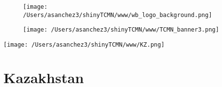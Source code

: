 \documentclass{article}\usepackage[]{graphicx}\usepackage[]{color}
\begin{document}
%

\begin{figure}
  \vspace{-3ex} %
  \hspace{-7ex} %
  \texttt{[image: /Users/asanchez3/shinyTCMN/www/wb\_logo\_background.png]}
\end{figure}
\begin{figure}
  \begin{minipage}[t]{0.99\textwidth} %
      \vspace{-30ex}
      \hspace{-2ex}
      \raggedright{\texttt{[image: /Users/asanchez3/shinyTCMN/www/TCMN\_banner3.png]}}
  \end{minipage}
\end{figure}
%
\begin{minipage}[t]{0.99\textwidth} %
  \vspace{-1.5cm}
  \begin{minipage}[c]{0.36\textwidth} 
    \begin{minipage}[c]{0.28\textwidth} %
      \texttt{[image: /Users/asanchez3/shinyTCMN/www/KZ.png]}
    \end{minipage}
    \begin{minipage}[c]{0.70\textwidth} %
      \section*{\color{blue!40!black}Kazakhstan}
    \end{minipage}
  \end{minipage}
  \begin{minipage}[c]{0.63\textwidth}
    \begin{flushleft}  
    \end{flushleft} 
  \end{minipage}  
\end{minipage} %
\end{document}
